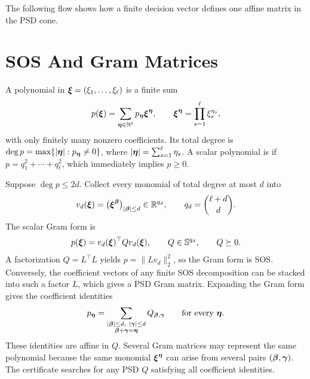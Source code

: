 The following flow shows how a finite decision vector defines one affine matrix in the PSD cone.

\begin{center}
\end{center}

\section{SOS And Gram Matrices}

A polynomial in $\boldsymbol{\xi}=(\xi_1,\ldots,\xi_\ell)$ is a finite sum
\begin{gather*}
  p(\boldsymbol{\xi})=
  \sum_{\boldsymbol{\eta}\in\mathbb N^\ell}
  p_{\boldsymbol{\eta}}\boldsymbol{\xi}^{\boldsymbol{\eta}},
  \qquad
  \boldsymbol{\xi}^{\boldsymbol{\eta}}
  =\prod_{s=1}^{\ell}\xi_s^{\eta_s},
\end{gather*}
with only finitely many nonzero coefficients. Its total degree is $\deg p=\max\{|\boldsymbol{\eta}|:p_{\boldsymbol{\eta}}\ne0\}$, where $|\boldsymbol{\eta}|=\sum_{s=1}^{\ell}\eta_s$. A scalar polynomial is  if $p=q_1^2+\cdots+q_t^2$, which immediately implies $p\ge0$.

Suppose $\deg p\le2d$. Collect every monomial of total degree at most $d$ into
\begin{gather*}
  v_d(\boldsymbol{\xi})
  =\bigl(\boldsymbol{\xi}^{\boldsymbol{\beta}}\bigr)_{|\boldsymbol{\beta}|\le d}
  \in\mathbb R^{q_d},
  \qquad
  q_d=\binom{\ell+d}{d}.
\end{gather*}
The scalar Gram form is
\begin{gather*}
  p(\boldsymbol{\xi})
  =v_d(\boldsymbol{\xi})^\top
  Qv_d(\boldsymbol{\xi}),
  \qquad
  Q\in\mathbb S^{q_d},
  \qquad Q\succeq0.
\end{gather*}
A factorization $Q=L^\top L$ yields $p=\lVert Lv_d\rVert_2^2$, so the Gram form is SOS. Conversely, the coefficient vectors of any finite SOS decomposition can be stacked into such a factor $L$, which gives a PSD Gram matrix. Expanding the Gram form gives the coefficient identities
\begin{gather*}
  p_{\boldsymbol{\eta}}
  =
  \sum_{\substack{|\boldsymbol{\beta}|\le d,\ |\boldsymbol{\gamma}|\le d\\
                  \boldsymbol{\beta}+\boldsymbol{\gamma}=\boldsymbol{\eta}}}
  Q_{\boldsymbol{\beta},\boldsymbol{\gamma}}
  \qquad
  \text{for every }\boldsymbol{\eta}.
\end{gather*}
These identities are affine in $Q$. Several Gram matrices may represent the same polynomial because the same monomial $\boldsymbol{\xi}^{\boldsymbol{\eta}}$ can arise from several pairs $(\boldsymbol{\beta},\boldsymbol{\gamma})$. The certificate searches for any PSD $Q$ satisfying all coefficient identities.

